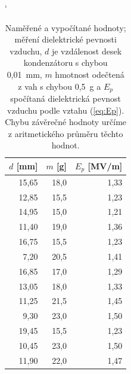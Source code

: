 \documentclass[english]{article}
\begin{document}
\begin{table}[h!]
\catcode` %
  \centering
    \begin{tabular}{|r|r|r|}
    \hline
    \boldmath{}\textbf{$d$ [mm]}\unboldmath{} & \boldmath{}\textbf{$m$ [g]}\unboldmath{} & \boldmath{}\textbf{$E_p$ [MV/m]}\unboldmath{} \bigstrut\\
    \hline
    15,65 & 18,0  & 1,33 \bigstrut\\
    \hline
    12,85 & 15,5  & 1,23 \bigstrut\\
    \hline
    14,95 & 15,0  & 1,21 \bigstrut\\
    \hline
    11,40 & 19,0  & 1,36 \bigstrut\\
    \hline
    16,75 & 15,5  & 1,23 \bigstrut\\
    \hline
    7,20  & 20,5  & 1,41 \bigstrut\\
    \hline
    16,85 & 17,0  & 1,29 \bigstrut\\
    \hline
    13,05 & 18,0  & 1,33 \bigstrut\\
    \hline
    11,25 & 21,5  & 1,45 \bigstrut\\
    \hline
    9,30  & 23,0  & 1,50 \bigstrut\\
    \hline
    19,45 & 15,5  & 1,23 \bigstrut\\
    \hline
    10,45 & 23,0  & 1,50 \bigstrut\\
    \hline
    11,90 & 22,0  & 1,47 \bigstrut\\
    \hline
    \end{tabular}%
      \caption{
      		Naměřené a vypočítané hodnoty; měření dielektrické pevnosti vzduchu, $d$ je vzdálenost desek kondenzátoru s chybou 0,01~mm, $m$ hmotnost odečtená z vah s chybou 0,5~g a $E_p$ spočítaná dielektrická pevnost vzduchu podle vztahu (\ref{eq:Ep}). Chybu závěrečné hodnoty určíme z aritmetického průměru těchto hodnot.  
      }
      \label{tab:kondenzator}%
\end{table}%
\end{document}
